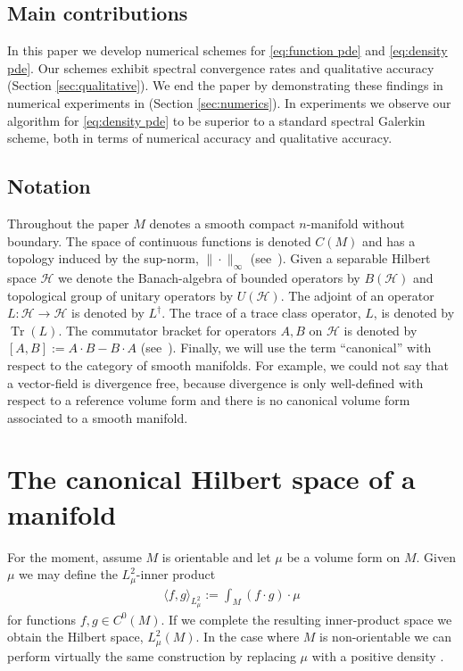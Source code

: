 \documentclass[final,leqno]{siamart}
\DeclareMathOperator{\Tr}{Tr}
\begin{document}
\subsection{Main contributions}

In this paper we develop numerical schemes for \eqref{eq:function pde} and \eqref{eq:density pde}.
Our schemes exhibit spectral convergence rates and qualitative accuracy (Section \ref{sec:qualitative}).
We end the paper by demonstrating these findings in numerical experiments in (Section \ref{sec:numerics}).
In experiments we observe our algorithm for \eqref{eq:density pde} to be superior to a standard spectral Galerkin scheme, both in terms of numerical accuracy and qualitative accuracy.

\subsection{Notation}
Throughout the paper $M$ denotes a smooth compact $n$-manifold without boundary. 
The space of continuous functions is denoted $C(M)$ and has a topology induced by the sup-norm, $\| \cdot \|_{\infty}$ (see~\cite{Taylor1974,Conway1990}).
Given a separable Hilbert space $\mathcal{H}$ we denote the Banach-algebra of bounded operators by $B( \mathcal{H})$ and topological group of unitary operators by $U( \mathcal{H})$.
The adjoint of an operator $L : \mathcal{H} \to \mathcal{H}$ is denoted by $L^{\dagger}$.
The trace of a trace class operator, $L$, is denoted by $\Tr(L)$.
The commutator bracket for operators $A,B$ on $\mathcal{H}$ is denoted by $[A,B] := A \cdot B - B \cdot A$ (see~\cite{Conway1990}).
Finally, we will use the term ``canonical''  with respect to the category of smooth manifolds.
For example, we could not say that a vector-field is divergence free, because divergence is only well-defined with respect to a reference volume form and there is no canonical volume form associated to a smooth manifold.


\section{The canonical Hilbert space of a manifold}
\label{sec:L2}
For the moment, assume $M$ is orientable and let $\mu$ be a volume form on $M$.
Given $\mu$ we may define the $L^2_{\mu}$-inner product
\begin{align*}
	\langle f, g \rangle_{L^2_\mu} := \int_M ( f \cdot g) \cdot \mu
\end{align*}
for functions $f,g \in C^0(M)$.
If we complete the resulting inner-product space we obtain the Hilbert space, $L^2_\mu(M)$.
In the case where $M$ is non-orientable we can perform virtually the same construction by replacing $\mu$ with a positive density \cite{Lee2006}.
\end{document}

